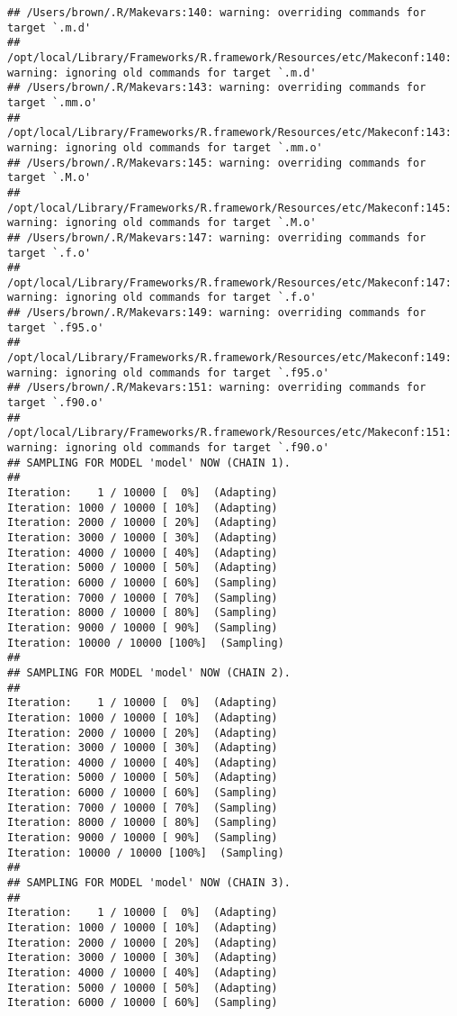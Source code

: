 \documentclass{article}\usepackage[]{graphicx}\usepackage[]{color}
\makeatletter
\newenvironment{kframe}{%
 \def\at@end@of@kframe{}%
 \ifinner\ifhmode%
  \def\at@end@of@kframe{\end{minipage}}%
  \begin{minipage}{\columnwidth}%
 \fi\fi%
 \def\FrameCommand##1{\hskip\@totalleftmargin \hskip-\fboxsep
 \colorbox{shadecolor}{##1}\hskip-\fboxsep
     \hskip-\linewidth \hskip-\@totalleftmargin \hskip\columnwidth}%
 \MakeFramed {\advance\hsize-\width
   \@totalleftmargin\z@ \linewidth\hsize
   \@setminipage}}%
 {\par\unskip\endMakeFramed%
 \at@end@of@kframe}
\newenvironment{knitrout}{}{} %
\makeatother
\begin{document}
\begin{knitrout}
\begin{kframe}
\begin{verbatim}
## /Users/brown/.R/Makevars:140: warning: overriding commands for target `.m.d'
## /opt/local/Library/Frameworks/R.framework/Resources/etc/Makeconf:140: warning: ignoring old commands for target `.m.d'
## /Users/brown/.R/Makevars:143: warning: overriding commands for target `.mm.o'
## /opt/local/Library/Frameworks/R.framework/Resources/etc/Makeconf:143: warning: ignoring old commands for target `.mm.o'
## /Users/brown/.R/Makevars:145: warning: overriding commands for target `.M.o'
## /opt/local/Library/Frameworks/R.framework/Resources/etc/Makeconf:145: warning: ignoring old commands for target `.M.o'
## /Users/brown/.R/Makevars:147: warning: overriding commands for target `.f.o'
## /opt/local/Library/Frameworks/R.framework/Resources/etc/Makeconf:147: warning: ignoring old commands for target `.f.o'
## /Users/brown/.R/Makevars:149: warning: overriding commands for target `.f95.o'
## /opt/local/Library/Frameworks/R.framework/Resources/etc/Makeconf:149: warning: ignoring old commands for target `.f95.o'
## /Users/brown/.R/Makevars:151: warning: overriding commands for target `.f90.o'
## /opt/local/Library/Frameworks/R.framework/Resources/etc/Makeconf:151: warning: ignoring old commands for target `.f90.o'
## SAMPLING FOR MODEL 'model' NOW (CHAIN 1).
## 
Iteration:    1 / 10000 [  0%]  (Adapting)
Iteration: 1000 / 10000 [ 10%]  (Adapting)
Iteration: 2000 / 10000 [ 20%]  (Adapting)
Iteration: 3000 / 10000 [ 30%]  (Adapting)
Iteration: 4000 / 10000 [ 40%]  (Adapting)
Iteration: 5000 / 10000 [ 50%]  (Adapting)
Iteration: 6000 / 10000 [ 60%]  (Sampling)
Iteration: 7000 / 10000 [ 70%]  (Sampling)
Iteration: 8000 / 10000 [ 80%]  (Sampling)
Iteration: 9000 / 10000 [ 90%]  (Sampling)
Iteration: 10000 / 10000 [100%]  (Sampling)
## 
## SAMPLING FOR MODEL 'model' NOW (CHAIN 2).
## 
Iteration:    1 / 10000 [  0%]  (Adapting)
Iteration: 1000 / 10000 [ 10%]  (Adapting)
Iteration: 2000 / 10000 [ 20%]  (Adapting)
Iteration: 3000 / 10000 [ 30%]  (Adapting)
Iteration: 4000 / 10000 [ 40%]  (Adapting)
Iteration: 5000 / 10000 [ 50%]  (Adapting)
Iteration: 6000 / 10000 [ 60%]  (Sampling)
Iteration: 7000 / 10000 [ 70%]  (Sampling)
Iteration: 8000 / 10000 [ 80%]  (Sampling)
Iteration: 9000 / 10000 [ 90%]  (Sampling)
Iteration: 10000 / 10000 [100%]  (Sampling)
## 
## SAMPLING FOR MODEL 'model' NOW (CHAIN 3).
## 
Iteration:    1 / 10000 [  0%]  (Adapting)
Iteration: 1000 / 10000 [ 10%]  (Adapting)
Iteration: 2000 / 10000 [ 20%]  (Adapting)
Iteration: 3000 / 10000 [ 30%]  (Adapting)
Iteration: 4000 / 10000 [ 40%]  (Adapting)
Iteration: 5000 / 10000 [ 50%]  (Adapting)
Iteration: 6000 / 10000 [ 60%]  (Sampling)

\end{verbatim}
\end{kframe}
\end{knitrout}
\end{document}
